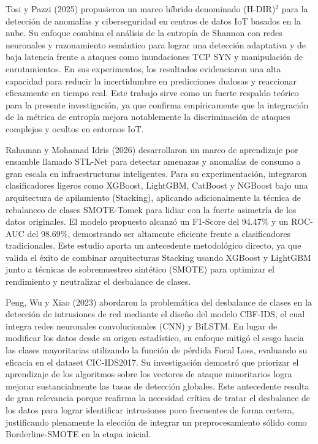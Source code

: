 Tosi y Pazzi (2025) propusieron un marco híbrido denominado (H-DIR)$^2$ para la detección de anomalías y ciberseguridad en centros de datos IoT basados en la nube. Su enfoque combina el análisis de la entropía de Shannon con redes neuronales y razonamiento semántico para lograr una detección adaptativa y de baja latencia frente a ataques como inundaciones TCP SYN y manipulación de enrutamientos. En sus experimentos, los resultados evidenciaron una alta capacidad para reducir la incertidumbre en predicciones dudosas y reaccionar eficazmente en tiempo real. Este trabajo sirve como un fuerte respaldo teórico para la presente investigación, ya que confirma empíricamente que la integración de la métrica de entropía mejora notablemente la discriminación de ataques complejos y ocultos en entornos IoT.

Rahaman y Mohamad Idris (2026) desarrollaron un marco de aprendizaje por ensamble llamado STL-Net para detectar amenazas y anomalías de consumo a gran escala en infraestructuras inteligentes. Para su experimentación, integraron clasificadores ligeros como XGBoost, LightGBM, CatBoost y NGBoost bajo una arquitectura de apilamiento (Stacking), aplicando adicionalmente la técnica de rebalanceo de clases SMOTE-Tomek para lidiar con la fuerte asimetría de los datos originales. El modelo propuesto alcanzó un F1-Score del 94.47\% y un ROC-AUC del 98.69\%, demostrando ser altamente eficiente frente a clasificadores tradicionales. Este estudio aporta un antecedente metodológico directo, ya que valida el éxito de combinar arquitecturas Stacking usando XGBoost y LightGBM junto a técnicas de sobremuestreo sintético (SMOTE) para optimizar el rendimiento y neutralizar el desbalance de clases.

Peng, Wu y Xiao (2023) abordaron la problemática del desbalance de clases en la detección de intrusiones de red mediante el diseño del modelo CBF-IDS, el cual integra redes neuronales convolucionales (CNN) y BiLSTM. En lugar de modificar los datos desde su origen estadístico, su enfoque mitigó el sesgo hacia las clases mayoritarias utilizando la función de pérdida Focal Loss, evaluando su eficacia en el dataset CIC-IDS2017. Su investigación demostró que priorizar el aprendizaje de los algoritmos sobre los vectores de ataque minoritarios logra mejorar sustancialmente las tasas de detección globales. Este antecedente resulta de gran relevancia porque reafirma la necesidad crítica de tratar el desbalance de los datos para lograr identificar intrusiones poco frecuentes de forma certera, justificando plenamente la elección de integrar un preprocesamiento sólido como Borderline-SMOTE en la etapa inicial.

